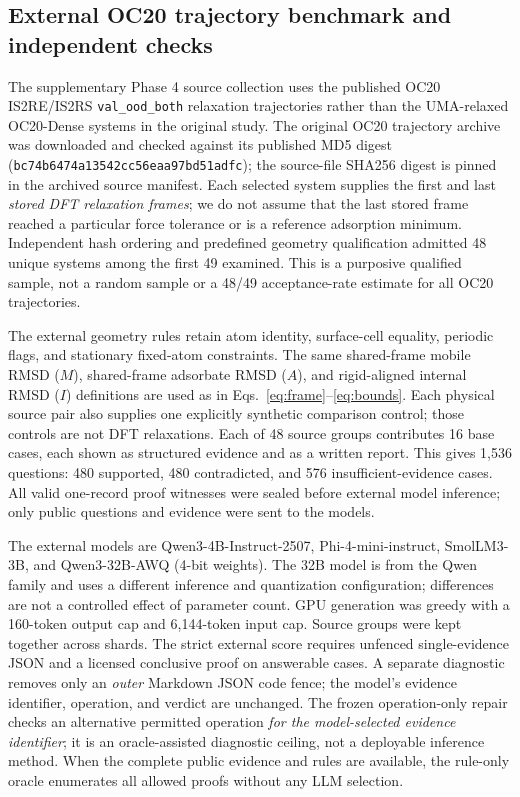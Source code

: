\subsection{External OC20 trajectory benchmark and independent checks}
\label{sec:external_methods}

The supplementary Phase 4 source collection uses the published OC20 IS2RE/IS2RS \texttt{val\_ood\_both} relaxation trajectories rather than the UMA-relaxed OC20-Dense systems in the original study.\cite{chanussot2021open} The original OC20 trajectory archive was downloaded and checked against its published MD5 digest (\texttt{bc74b6474a13542cc56eaa97bd51adfc}); the source-file SHA256 digest is pinned in the archived source manifest. Each selected system supplies the first and last \emph{stored DFT relaxation frames}; we do not assume that the last stored frame reached a particular force tolerance or is a reference adsorption minimum. Independent hash ordering and predefined geometry qualification admitted 48 unique systems among the first 49 examined. This is a purposive qualified sample, not a random sample or a 48/49 acceptance-rate estimate for all OC20 trajectories.

The external geometry rules retain atom identity, surface-cell equality, periodic flags, and stationary fixed-atom constraints. The same shared-frame mobile RMSD ($M$), shared-frame adsorbate RMSD ($A$), and rigid-aligned internal RMSD ($I$) definitions are used as in Eqs.~\ref{eq:frame}--\ref{eq:bounds}. Each physical source pair also supplies one explicitly synthetic comparison control; those controls are not DFT relaxations. Each of 48 source groups contributes 16 base cases, each shown as structured evidence and as a written report. This gives 1,536 questions: 480 supported, 480 contradicted, and 576 insufficient-evidence cases. All valid one-record proof witnesses were sealed before external model inference; only public questions and evidence were sent to the models.

The external models are Qwen3-4B-Instruct-2507, Phi-4-mini-instruct, SmolLM3-3B, and Qwen3-32B-AWQ (4-bit weights). The 32B model is from the Qwen family and uses a different inference and quantization configuration; differences are not a controlled effect of parameter count. GPU generation was greedy with a 160-token output cap and 6,144-token input cap. Source groups were kept together across shards. The strict external score requires unfenced single-evidence JSON and a licensed conclusive proof on answerable cases. A separate diagnostic removes only an \emph{outer} Markdown JSON code fence; the model's evidence identifier, operation, and verdict are unchanged. The frozen operation-only repair checks an alternative permitted operation \emph{for the model-selected evidence identifier}; it is an oracle-assisted diagnostic ceiling, not a deployable inference method. When the complete public evidence and rules are available, the rule-only oracle enumerates all allowed proofs without any LLM selection.

